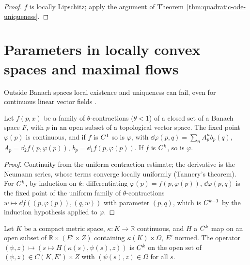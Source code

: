\begin{proof}
  \leanok
  $f$ is locally Lipschitz; apply the argument of Theorem~\ref{thm:quadratic-ode-uniqueness}.
\end{proof}

\section{Parameters in locally convex spaces and maximal flows}

Outside Banach spaces local existence and uniqueness can fail, even for continuous linear vector
fields \cite[Examples~2.4.2 and 2.4.3]{GN26}.

\begin{lemma}
  \label{lem:uniform-contraction}
  \leanok
  Let $f(p, x)$ be a family of $\theta$-contractions ($\theta < 1$) of a closed set of a Banach
  space $F$, with $p$ in an open subset of a topological vector space. The fixed point
  $\varphi(p)$ is continuous, and if $f$ is $C^{1}$ so is $\varphi$, with
  $\dd\varphi(p, q) = \sum_n A_p^n b_p(q)$, $A_p = \dd_2 f(p, \varphi(p))$,
  $b_p = \dd_1 f(p, \varphi(p))$. If $f$ is $C^{k}$, so is $\varphi$.
\end{lemma}

\begin{proof}
  \leanok
  Continuity from the uniform contraction estimate; the derivative is the Neumann series, whose
  terms converge locally uniformly (Tannery's theorem). For $C^{k}$, by induction on $k$:
  differentiating $\varphi(p) = f(p, \varphi(p))$, $\dd\varphi(p, q)$ is the fixed point of
  the uniform family of $\theta$-contractions $w \mapsto \dd f((p, \varphi(p)), (q, w))$ with
  parameter $(p, q)$, which is $C^{k-1}$ by the induction hypothesis applied to $\varphi$.
\end{proof}

\begin{lemma}
  \label{lem:ck-superposition-param}
  \leanok
  Let $K$ be a compact metric space, $\kappa \colon K \to \mathbb{R}$ continuous, and $H$ a
  $C^{k}$ map on an open subset of $\mathbb{R} \times (E' \times Z)$ containing
  $\kappa(K) \times \Omega$, $E'$ normed. The operator
  $(\psi, z) \mapsto (s \mapsto H(\kappa(s), \psi(s), z))$ is $C^{k}$ on the open set of
  $(\psi, z) \in C(K, E') \times Z$ with $(\psi(s), z) \in \Omega$ for all $s$.
\end{lemma}

